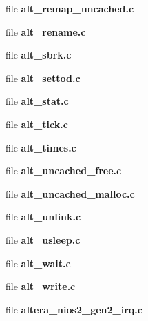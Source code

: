 \begin{DoxyCompactItemize}
\item 
file {\bf alt\+\_\+remap\+\_\+uncached.\+c}
\item 
file {\bf alt\+\_\+rename.\+c}
\item 
file {\bf alt\+\_\+sbrk.\+c}
\item 
file {\bf alt\+\_\+settod.\+c}
\item 
file {\bf alt\+\_\+stat.\+c}
\item 
file {\bf alt\+\_\+tick.\+c}
\item 
file {\bf alt\+\_\+times.\+c}
\item 
file {\bf alt\+\_\+uncached\+\_\+free.\+c}
\item 
file {\bf alt\+\_\+uncached\+\_\+malloc.\+c}
\item 
file {\bf alt\+\_\+unlink.\+c}
\item 
file {\bf alt\+\_\+usleep.\+c}
\item 
file {\bf alt\+\_\+wait.\+c}
\item 
file {\bf alt\+\_\+write.\+c}
\item 
file {\bf altera\+\_\+nios2\+\_\+gen2\+\_\+irq.\+c}
\end{DoxyCompactItemize}
